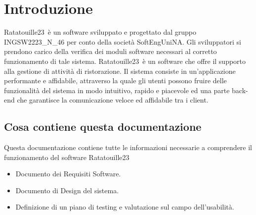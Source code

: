 \section{Introduzione}
Ratatouille23\texttrademark\ è un software sviluppato e progettato dal gruppo INGSW2223\_N\_46 per conto della società SoftEngUniNA\texttrademark. \newline
Gli sviluppatori si prendono carico della verifica dei moduli software necessari al corretto funzionamento di tale sistema.
Ratatouille23\texttrademark\ è un software che offre il supporto alla gestione di attività di
ristorazione.\newline
Il sistema consiste in un'applicazione performante e affidabile, attraverso la quale gli utenti
possono fruire delle funzionalità del sistema in modo intuitivo, rapido e piacevole ed una parte back-end che garantisce la comunicazione veloce ed affidabile tra i client.

\subsection{Cosa contiene questa documentazione}
Questa documentazione contiene tutte le informazioni necessarie a comprendere il funzionamento del software Ratatouille23\texttrademark
\begin{itemize}
    \item Documento dei Requisiti Software.
    \item Documento di Design del sistema.
    \item Definizione di un piano di testing e valutazione sul campo dell'usabilità.
\end{itemize}

